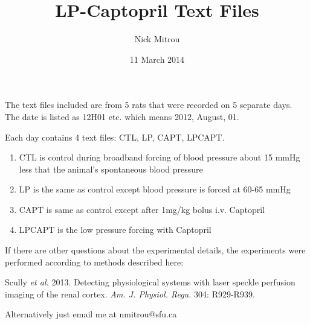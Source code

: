 \documentclass{article}
\title{LP-Captopril Text Files}
\author{Nick Mitrou}
\date{11 March 2014}
\begin{document}
\maketitle
The text files included are from 5 rats that were recorded on 5 separate days. The date is listed as 12H01 etc. which means 2012, August, 01. 

Each day contains 4 text files: CTL, LP, CAPT, LPCAPT. 

\begin{enumerate}

	\item CTL is control during broadband forcing of blood pressure about 15 mmHg less that the animal's spontaneous blood pressure
	\item LP is the same as control except blood pressure is forced at 60-65 mmHg
	\item CAPT is same as control except after 1mg/kg bolus i.v. Captopril
	\item LPCAPT is the low pressure forcing with Captopril
\end{enumerate}

If there are other questions about the experimental details, the experiments were performed according to methods described here:

Scully \textit{et al.} 2013. Detecting physiological systems with laser speckle perfusion imaging of the renal cortex. \textit{Am. J. Physiol. Regu.} 304: R929-R939.

Alternatively just email me at nmitrou@sfu.ca
\end{document}
